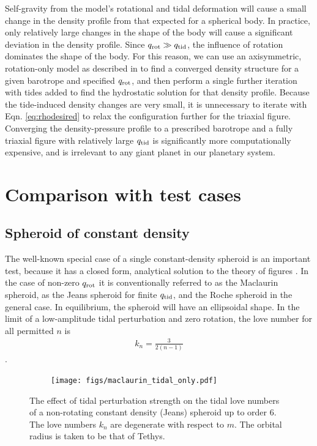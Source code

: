 Self-gravity from the model's rotational and tidal deformation will cause a small
change in the density profile from that expected for a spherical body.  In practice,
only relatively large changes in the shape of the body will cause a significant
deviation in the density profile. Since $q_{\rm rot} \gg q_{\rm tid}$, the influence
of rotation dominates the shape of the body. For this reason, we can use an
axisymmetric, rotation-only model as described in \citet{hubbard2013} to find a
converged density structure for a given barotrope and specified $q_{\rm rot}$, and
then perform a single further iteration with tides added to find the hydrostatic
solution for that density profile.  Because the tide-induced density changes are very
small, it is unnecessary to iterate with Eqn.  \eqref{eq:rhodesired} to relax the
configuration further for the triaxial figure. Converging the density-pressure
profile to a prescribed barotrope and a fully triaxial figure with relatively large
$q_{\rm tid}$ is significantly more computationally expensive, and is irrelevant to
any giant planet in our planetary system.

\section{Comparison with test cases} \label{tests}

\subsection{Spheroid of constant density} \label{maclaurin}

The well-known special case of a single constant-density spheroid is an
important test, because it has a closed form, analytical solution to the theory
of figures \citep{tassoul2015}. In the case of non-zero $q_{\rm rot}$ it is
conventionally referred to as the Maclaurin spheroid, as the Jeans spheroid for
finite $q_{\rm tid}$, and the Roche spheroid in the general case. In
equilibrium, the spheroid will have an ellipsoidal shape. In the limit of a
low-amplitude tidal perturbation and zero rotation, the love number for all
permitted $n$ is
%
\begin{equation}
\begin{aligned}
    k_n = \frac{3}{2(n-1)}
\end{aligned}
\label{eq:mac_kn}
\end{equation}
%
\citep{munk2009}. 


\begin{figure}[h!]  
  \centering
    \texttt{[image: figs/maclaurin\_tidal\_only.pdf]}
\caption{ The effect of tidal perturbation strength on the tidal love numbers of a
non-rotating constant density (Jeans) spheroid up to order 6. The love numbers $k_n$ are degenerate
with respect to $m$. The orbital radius is taken to be that of Tethys.}
\label{fig:maclaurin_tidal_only}
\end{figure}

